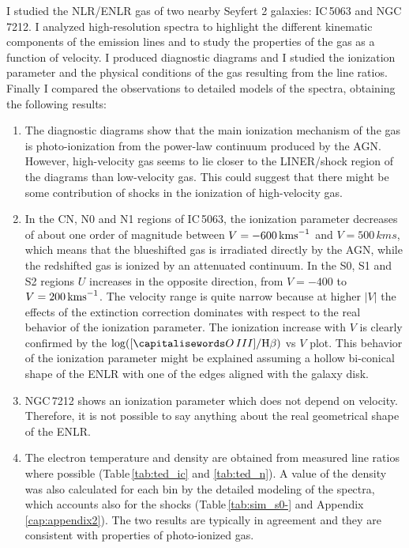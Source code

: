 \documentclass[../main.tex]{subfiles}
\begin{document}
I studied the NLR/ENLR gas of two nearby Seyfert 2 galaxies: IC\,5063 and NGC\,7212.
I analyzed high-resolution spectra to highlight the different kinematic components of the emission lines and to study the properties of the gas as a function of velocity.
I produced diagnostic diagrams and I studied the ionization parameter and the physical conditions
of the gas resulting from the line ratios.
Finally I compared the observations to detailed models of the spectra, obtaining the following results: 

\begin{enumerate}
\item The diagnostic diagrams show that the main ionization mechanism of the gas is photo-ionization from the power-law continuum produced by the AGN.
However, high-velocity gas seems to lie closer to the LINER/shock region of the diagrams than low-velocity gas. 
This could suggest that there might be some contribution of shocks in the ionization of high-velocity gas.

\item In the CN, N0 and N1 regions of IC\,5063, the ionization parameter decreases of about one order of magnitude between $V=-600\,\si{\kms}$ and $V=500\,\si{kms}$, which means that the blueshifted gas is irradiated directly by the AGN, while the redshifted gas is ionized by an attenuated continuum.
In the S0, S1 and S2 regions $U$ increases in the opposite direction, from $V=-400$ to $V=200\,\si{\kms}$.
The velocity range is quite narrow because at higher $\lvert V \rvert$ the effects of the extinction correction dominates with respect to the real behavior of the ionization parameter.
The ionization increase with $V$ is clearly confirmed by the $\log([\ion{O}{III}]/\Hb)$ vs $V$ plot.
This behavior of the ionization parameter might be explained assuming a hollow bi-conical shape of the ENLR with one of the edges aligned with the galaxy disk.

\item NGC\,7212 shows an ionization parameter which does not depend on velocity.
Therefore, it is not possible to say anything about the real geometrical shape of the ENLR.

\item The electron temperature and density are obtained from measured line ratios where possible (Table\,\ref{tab:ted_ic} and \ref{tab:ted_n}).
A value of the density was also calculated for each bin by the detailed modeling of the spectra, which accounts also for the shocks (Table\,\ref{tab:sim_s0-} and Appendix\,\ref{cap:appendix2}).
The two results are typically in agreement and they are consistent with properties of photo-ionized gas.


\end{enumerate}
\end{document}
